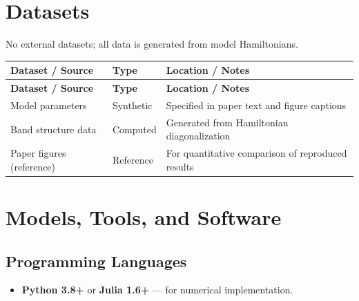 \documentclass[11pt,a4paper]{article}
\begin{document}
\section{Datasets}
No external datasets; all data is generated from model Hamiltonians.

\begin{longtable}{p{4.5cm} p{3.5cm} p{6cm}}
\toprule
\textbf{Dataset / Source} & \textbf{Type} & \textbf{Location / Notes} \\
\midrule
\endfirsthead
\toprule
\textbf{Dataset / Source} & \textbf{Type} & \textbf{Location / Notes} \\
\midrule
\endhead
Model parameters & Synthetic & Specified in paper text and figure captions \\
\midrule
Band structure data & Computed & Generated from Hamiltonian diagonalization \\
\midrule
Paper figures (reference) & Reference & For quantitative comparison of reproduced results \\
\bottomrule
\end{longtable}

\section{Models, Tools, and Software}

\subsection{Programming Languages}
\begin{itemize}
  \item \textbf{Python 3.8+} or \textbf{Julia 1.6+} --- for numerical implementation.
\end{itemize}
\end{document}
